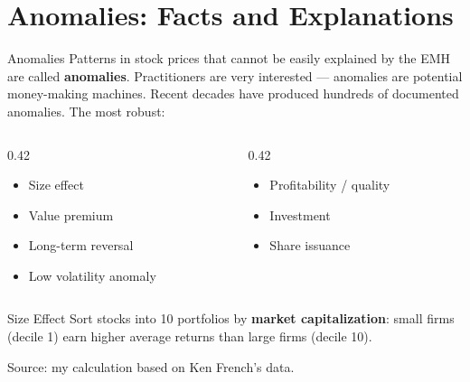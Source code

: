 \documentclass[aspectratio=169]{beamer}
\begin{document}

\section{Anomalies: Facts and Explanations}

\begin{frame}{Anomalies}
Patterns in stock prices that cannot be easily explained by the EMH are called \textbf{anomalies}. Practitioners are very interested --- anomalies are potential money-making machines. Recent decades have produced hundreds of documented anomalies. The most robust:
\begin{columns}
\begin{column}{0.42\textwidth}
\begin{itemize}
  \item Size effect
  \item Value premium
  \item Long-term reversal
  \item Low volatility anomaly
\end{itemize}
\end{column}
\begin{column}{0.42\textwidth}
\begin{itemize}
  \item Profitability / quality
  \item Investment
  \item Share issuance
\end{itemize}
\end{column}
\end{columns}
\end{frame}

\begin{frame}{Size Effect}
Sort stocks into 10 portfolios by \textbf{market capitalization}: small firms (decile 1) earn higher average returns than large firms (decile 10).
\vspace{0.6em}

\begin{center}
\small Source: my calculation based on Ken French's data.
\end{center}
\end{frame}
\end{document}
